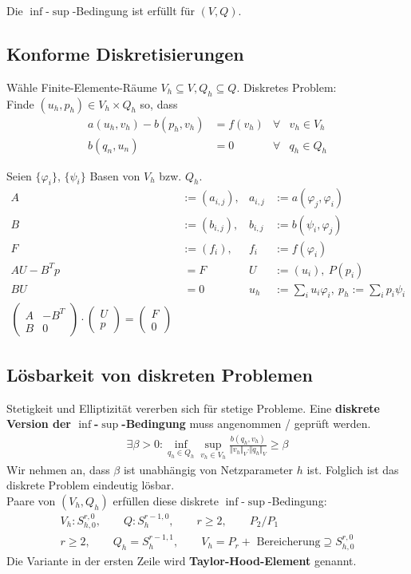 Die $\inf$-$\sup$-Bedingung ist erfüllt für $(V,Q)$.

\subsection{Konforme Diskretisierungen} %
Wähle Finite-Elemente-Räume $V_h\subseteq V,Q_h\subseteq Q$.
Diskretes Problem:\\
Finde $(u_h,p_h)\in V_h\times Q_h$ so, dass
\begin{align*}
	a(u_h,v_h)-b(p_h,v_h)&=f(v_h) &\forall& v_h\in V_h\\
	b(q_n,u_n)&=0 &\forall& q_h\in Q_h
\end{align*}

Seien $\lbrace\varphi_i\rbrace$, $\lbrace\psi_i\rbrace$ Basen von $V_h$ bzw. $Q_h$.
\begin{align*}
	A&:=(a_{i,j}), &a_{i,j}&:=a(\varphi_j,\varphi_i)\\
	B&:=(b_{i,j}), &b_{i,j}&:=b(\psi_i,\varphi_j)\\
	F&:=(f_i), &f_i&:=f(\varphi_i)\\
	AU-B^T p&~=F &U&:=(u_i),~P(p_i)\\
	BU&~=0 &u_h&:=\sum\limits_i u_i\varphi_i,~p_h:=\sum\limits_i p_i\psi_i\\
	\begin{pmatrix}
		A & -B^T\\
		B & 0
	\end{pmatrix}\cdot\begin{pmatrix}
		U\\
		p
	\end{pmatrix}
	=\begin{pmatrix}
		F\\
		0
	\end{pmatrix}
\end{align*}

\subsection*{Lösbarkeit von diskreten Problemen}
Stetigkeit und Elliptizität vererben sich für stetige Probleme.
Eine \textbf{diskrete Version der $\inf$-$\sup$-Bedingung} muss angenommen / geprüft werden.
\begin{align*}
	\exists\beta>0:\inf\limits_{q_h\in Q_h}\sup\limits_{v_h\in V_h}\frac{b(q_h,v_h)}{\Vert v_h\Vert_V\cdot\Vert q_h\Vert_V}\geq\beta
\end{align*}
Wir nehmen an, dass $\beta$ ist unabhängig von Netzparameter $h$ ist.
Folglich ist das diskrete Problem eindeutig lösbar.\\
Paare von $(V_h,Q_h)$ erfüllen diese diskrete $\inf$-$\sup$-Bedingung:
\begin{align*}
	V_h:S_{h,0}^{r,0},\qquad Q:S_h^{r-1,0},\qquad r\geq2,\qquad P_2/P_1\\
	r\geq 2,\qquad Q_h=S_h^{r-1,1},\qquad V_h=P_r+\text{ Bereicherung}\supseteq S_{h,0}^{r,0}
\end{align*}
Die Variante in der ersten Zeile wird \textbf{Taylor-Hood-Element} genannt.

